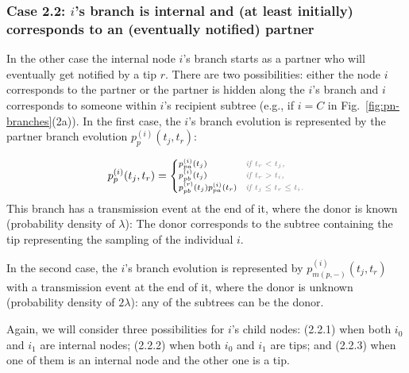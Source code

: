 \documentclass[10pt,letterpaper]{article}
\begin{document}
\subsubsection*{Case 2.2: $i$'s branch is internal and (at least initially) corresponds to an (eventually notified) partner} 

In the other case the internal node $i$'s branch starts as a partner who will eventually get notified by a tip $r$.
There are two possibilities: either the node $i$ corresponds to the partner or the partner is hidden along the $i$'s branch and $i$ corresponds to someone within $i$'s recipient subtree (e.g., if $i=C$ in Fig.~\ref{fig:pn-branches}(2a)). In the first case, the $i$'s branch evolution is represented by the partner branch evolution $p_{p}^{(i)}(t_j, t_r)$:

\begin{equation}
\scriptsize
p_{p}^{(i)}(t_j, t_r) =
\begin{cases}
p_{pa}^{(i)}(t_j) &\textit{\color{gray} if $t_r < t_j$,}\\
p_{pb}^{(i)}(t_j) &\textit{\color{gray} if $t_r > t_i$,}\\
p_{pb}^{(r)}(t_j)p_{pa}^{(i)}(t_r) &\textit{\color{gray} if $t_j \leq t_r \leq t_i$.}\\
\end{cases}\label{eq:p-p}
\end{equation}
This branch has a transmission event at the end of it, where the donor is known (probability density of $\lambda$): The donor corresponds to the subtree containing the tip representing the sampling of the individual $i$.

In the second case, the $i$'s branch evolution is represented by $p_{m(p,-)}^{(i)}(t_j,t_r)$ with a transmission event at the end of it, where the donor is unknown (probability density of $2\lambda$): any of the subtrees can be the donor.
 
Again, we will consider three possibilities for $i$'s child nodes: (2.2.1) when both $i_0$ and $i_1$ are internal nodes; (2.2.2) when both $i_0$ and $i_1$ are tips; and (2.2.3) when one of them is an internal node and the other one is a tip.

\end{document}

